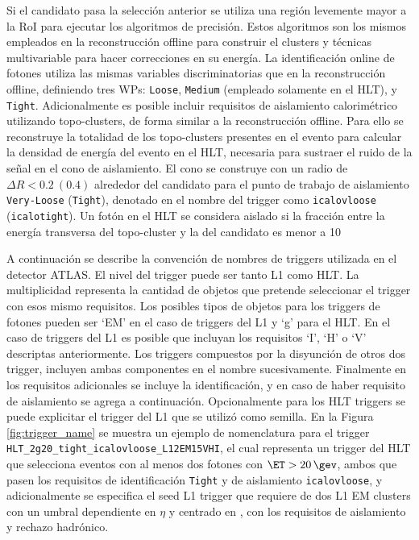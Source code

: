 Si el candidato pasa la selección anterior se utiliza una región levemente mayor a la RoI para ejecutar los algoritmos de precisión. Estos algoritmos son los mismos empleados en la reconstrucción offline \cite{Lampl:1099735} para construir el clusters y técnicas multivariable \cite{PERF-2017-03} para hacer correcciones en su energía. La identificación online de fotones utiliza las mismas variables discriminatorias que en la reconstrucción offline, definiendo tres WPs: \texttt{Loose}, \texttt{Medium} (empleado solamente en el HLT), y \texttt{Tight}.
Adicionalmente es posible incluir requisitos de aislamiento calorimétrico utilizando topo-clusters, de forma similar a la reconstrucción offline. Para ello se reconstruye la totalidad de los topo-clusters presentes en el evento para calcular la densidad de energía del evento en el HLT, necesaria para sustraer el ruido de la señal en el cono de aislamiento. El cono se construye con un radio de  $\Delta R < 0.2\:(0.4)$ alrededor del candidato para el punto de trabajo de aislamiento \texttt{Very-Loose} (\texttt{Tight}), denotado en el nombre del trigger como \texttt{icalovloose} (\texttt{icalotight}). Un fotón en el HLT se considera aislado si la fracción entre la energía transversa del topo-cluster y la del candidato es menor a
10



A continuación se describe la convención de nombres de triggers utilizada en el detector ATLAS.
El nivel del trigger puede ser tanto L1 como HLT. La multiplicidad representa la cantidad de objetos que pretende seleccionar el trigger con esos mismo requisitos. Los posibles tipos de objetos para los triggers de fotones pueden ser `EM' en el caso de triggers del L1 y `g' para el HLT. En el caso de triggers del L1 es posible que incluyan los requisitos `I', `H' o `V' descriptas anteriormente. Los triggers compuestos por la disyunción de otros dos trigger, incluyen ambas componentes en el nombre sucesivamente. Finalmente en los requisitos adicionales se incluye la identificación, y en caso de haber requisito de aislamiento se agrega a continuación. Opcionalmente para los HLT triggers se puede explicitar el trigger del L1 que se utilizó como semilla. En la Figura \ref{fig:trigger_name} se muestra un ejemplo de nomenclatura para el trigger \texttt{HLT\_2g20\_tight\_icalovloose\_L12EM15VHI}, el cual representa un trigger del HLT que selecciona eventos con al menos dos fotones con $\ET>20\,\gev$, ambos que pasen los requisitos de identificación \texttt{Tight} y de aislamiento \texttt{icalovloose}, y adicionalmente se especifica el seed L1 trigger que requiere de dos L1 EM clusters con un umbral dependiente en $\eta$ y centrado en , con los requisitos de aislamiento y rechazo hadrónico.

